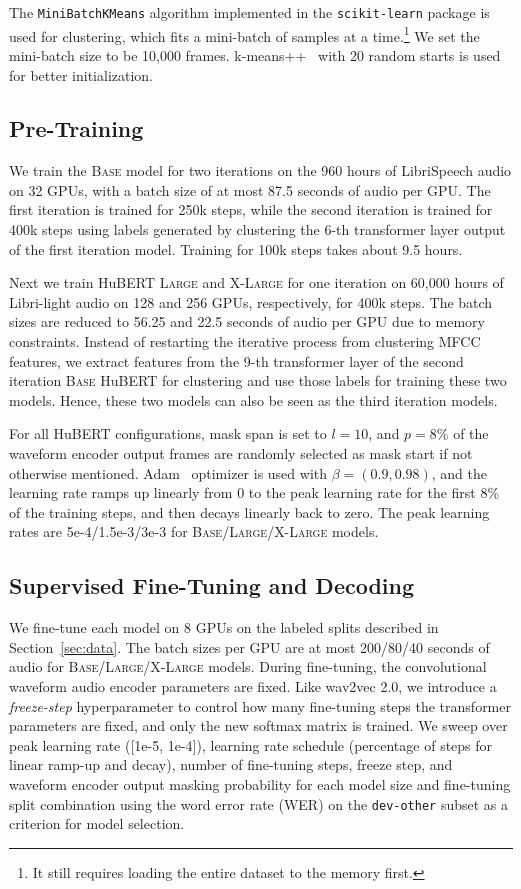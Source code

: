 The \texttt{MiniBatchKMeans} algorithm implemented in the \texttt{scikit-learn} \cite{pedregosa2011scikit} package is used for clustering, which fits a mini-batch of samples at a time.\footnote{It still requires loading the entire dataset to the memory first.} We set the mini-batch size to be 10,000 frames. k-means++~\cite{arthur2006k} with 20 random starts is used for better initialization.

\subsection{Pre-Training}\label{sec:pretrain}
We train the \textsc{Base} model for two iterations on the 960 hours of LibriSpeech audio on 32 GPUs, with a batch size of at most 87.5 seconds of audio per GPU. The first iteration is trained for 250k steps, while the second iteration is trained for 400k steps using labels generated by clustering the 6-th transformer layer output of the first iteration model. Training for 100k steps takes about 9.5 hours.

Next we train HuBERT \textsc{Large} and \textsc{X-Large} for one iteration on 60,000 hours of Libri-light audio on 128 and 256 GPUs, respectively, for 400k steps. The batch sizes are reduced to 56.25 and 22.5 seconds of audio per GPU due to memory constraints.
Instead of restarting the iterative process from clustering MFCC features, we extract features from the 9-th transformer layer of the second iteration \textsc{Base} HuBERT for clustering and use those labels for training these two models. Hence, these two models can also be seen as the third iteration models.

For all HuBERT configurations, mask span is set to $l=10$, and $p=8\%$ of the waveform encoder output frames are randomly selected as mask start if not otherwise mentioned. Adam~\cite{kingma2014adam} optimizer is used with $\beta = (0.9, 0.98)$, and the learning rate ramps up linearly from 0 to the peak learning rate for the first 8\% of the training steps, and then decays linearly back to zero. The peak learning rates are 5e-4/1.5e-3/3e-3 for \textsc{Base}/\textsc{Large}/\textsc{X-Large} models.


\subsection{Supervised Fine-Tuning and Decoding}
We fine-tune each model on 8 GPUs on the labeled splits described in Section~\ref{sec:data}. The batch sizes per GPU are at most 200/80/40 seconds of audio for \textsc{Base}/\textsc{Large}/\textsc{X-Large} models. During fine-tuning, the convolutional waveform audio encoder parameters are fixed. Like wav2vec 2.0, we introduce a \textit{freeze-step} hyperparameter to control how many fine-tuning steps the transformer parameters are fixed, and only the new softmax matrix is trained. 
We sweep over peak learning rate ([1e-5, 1e-4]), learning rate schedule (percentage of steps for linear ramp-up and decay), number of fine-tuning steps, freeze step, and waveform encoder output masking probability for each model size and fine-tuning split combination using the word error rate (WER) on the \texttt{dev-other} subset as a criterion for model selection.

